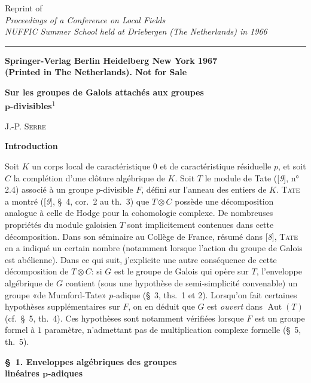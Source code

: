 \begin{center}
Reprint of\\
\textit{Proceedings of a Conference on Local Fields}\\
\textit{NUFFIC Summer School held at Driebergen (The Netherlands) in 1966}

\rule{0.87\linewidth}{0.5pt}

\textbf{Springer-Verlag Berlin Heidelberg New York 1967}\\
\textbf{(Printed in The Netherlands). Not for Sale}

\bigskip
\textbf{Sur les groupes de Galois attachés aux groupes}\\
\textbf{$\boldsymbol{p}$-divisibles}\textsuperscript{1}

\bigskip
J.-P. \textsc{Serre}
\end{center}
\begin{center}\textbf{Introduction}\end{center}

Soit $K$ un corps local de caractéristique $0$ et de caractéristique résiduelle $p$, et soit $C$ la complétion d’une clôture algébrique de $K$. Soit $T$ le module de Tate ([\textit{9}], n° 2.4) associé à un groupe $p$-divisible $F$, défini sur l’anneau des entiers de $K$. \textsc{Tate} a montré ([\textit{9}], \S~4, cor.~2 au th.~3) que $T\otimes C$ possède une décomposition analogue à celle de Hodge pour la cohomologie complexe. De nombreuses propriétés du module galoisien $T$ sont implicitement contenues dans cette décomposition. Dans son séminaire au Collège de France, résumé dans [\textit{8}], \textsc{Tate} en a indiqué un certain nombre (notamment lorsque l’action du groupe de Galois est abélienne). Dans ce qui suit, j’explicite une autre conséquence de cette décomposition de $T\otimes C$: si $G$ est le groupe de Galois qui opère sur $T$, l’enveloppe algébrique de $G$ contient (sous une hypothèse de semi-simplicité convenable) un groupe «de Mumford-Tate» $p$-adique (\S~3, ths.~1 et 2). Lorsqu’on fait certaines hypothèses supplémentaires sur $F$, on en déduit que $G$ est \textit{ouvert} dans $\operatorname{Aut}(T)$ (cf.~\S~5, th.~4). Ces hypothèses sont notamment vérifiées lorsque $F$ est un groupe formel à $1$ paramètre, n’admettant pas de multiplication complexe formelle (\S~5, th.~5).

\begin{center}\textbf{\S~1. Enveloppes algébriques des groupes\\ linéaires $\boldsymbol{p}$-adiques}\end{center}

